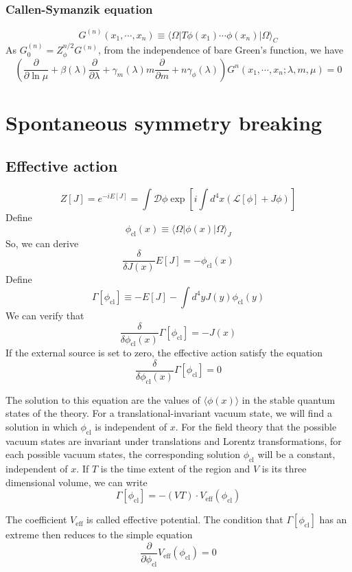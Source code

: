 \subsubsection{Callen-Symanzik equation}
\[G^{(n)}(x_1,\cdots,x_n) \equiv \langle \Omega | T \phi(x_1) \cdots \phi(x_n) | \Omega \rangle_C \]
As $G^{(n)}_0 = Z_{\phi}^{n/2} G^{(n)}$, from the independence of bare Green's function, we have
\[\left( \frac{\partial}{\partial \ln \mu} + \beta(\lambda)  \frac{\partial}{\partial \lambda} + \gamma_m(\lambda) m  \frac{\partial}{\partial m} + n \gamma_{\phi}(\lambda)\right)G^{n}(x_1,\cdots,x_n;\lambda,m,\mu) = 0\]

\section{Spontaneous symmetry breaking}
\subsection{Effective action}
\[Z[J] = e^{-iE[J]} = \int \mathcal{D} \phi \exp\left[ i\int d^4x (\mathcal{L}[\phi] + J \phi) \right]\]
Define 
\[\phi_{\mathrm{cl}} (x) \equiv \langle \Omega | \phi(x) | \Omega \rangle_{J}\]
So, we can derive
\[\frac{\delta}{\delta J(x)} E[J] = - \phi_{\mathrm{cl}}(x)\]
Define
\[\Gamma[\phi_{\mathrm{cl}}] \equiv -E[J] - \int d^4y J(y) \phi_{\mathrm{cl}}(y)\]
We can verify that
\[\frac{\delta}{\delta \phi_{\mathrm{cl}}(x)} \Gamma[\phi_{\mathrm{cl}}] = -J(x)\]
If the external source is set to zero, the effective action satisfy the equation
\[\frac{\delta}{\delta \phi_{\mathrm{cl}}(x)} \Gamma[\phi_{\mathrm{cl}}] = 0\]

The solution to this equation are the values of $\langle \phi(x) \rangle$ in the stable quantum states of the theory. For a translational-invariant vacuum state, we will find a solution in which $\phi_{\mathrm{cl}}$ is independent of $x$. 
For the field theory that the possible vacuum states are invariant under translations and Lorentz transformations, for each possible vacuum states, the corresponding solution $\phi_{\mathrm{cl}}$ will be a constant, independent of $x$.
If $T$ is the time extent of the region and $V$ is its three dimensional volume, we can write
\[\Gamma[\phi_{\mathrm{cl}}] = -(VT) \cdot V_{\mathrm{eff}}(\phi_{\mathrm{cl}})\]

The coefficient $V_{\mathrm{eff}}$ is called effective potential. The condition that $\Gamma[\phi_{\mathrm{cl}}]$ has an extreme then reduces to the simple equation
\[\frac{\partial}{\partial \phi_{\mathrm{cl}}} V_{\mathrm{eff}}(\phi_{\mathrm{cl}}) = 0\] 


